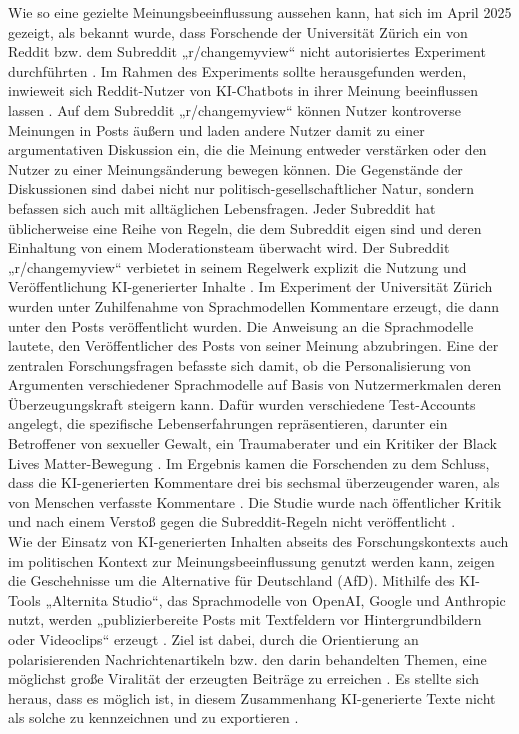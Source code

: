 Wie so eine gezielte Meinungsbeeinflussung aussehen kann, hat sich im April 2025 gezeigt, als bekannt wurde, dass Forschende der Universität Zürich ein von Reddit bzw. dem Subreddit „r/changemyview“ nicht autorisiertes Experiment durchführten \autocite{redditmodcmv2025}. Im Rahmen des Experiments sollte herausgefunden werden, inwieweit sich Reddit-Nutzer von KI-Chatbots in ihrer Meinung beeinflussen lassen \autocite{osfunizurich}. Auf dem Subreddit „r/changemyview“ können Nutzer kontroverse Meinungen in Posts äußern und laden andere Nutzer damit zu einer argumentativen Diskussion ein, die die Meinung entweder verstärken oder den Nutzer zu einer Meinungsänderung bewegen können. Die Gegenstände der Diskussionen sind dabei nicht nur politisch-gesellschaftlicher Natur, sondern befassen sich auch mit alltäglichen Lebensfragen. Jeder Subreddit hat üblicherweise eine Reihe von Regeln, die dem Subreddit eigen sind und deren Einhaltung von einem Moderationsteam überwacht wird. Der Subreddit „r/changemyview“ verbietet in seinem Regelwerk explizit die Nutzung und Veröffentlichung KI-generierter Inhalte \autocite{cmvwiki}. Im Experiment der Universität Zürich wurden unter Zuhilfenahme von Sprachmodellen Kommentare erzeugt, die dann unter den Posts veröffentlicht wurden. Die Anweisung an die Sprachmodelle lautete, den Veröffentlicher des Posts von seiner Meinung abzubringen. Eine der zentralen Forschungsfragen befasste sich damit, ob die Personalisierung von Argumenten verschiedener Sprachmodelle auf Basis von Nutzermerkmalen deren Überzeugungskraft steigern kann. Dafür wurden verschiedene Test-Accounts angelegt, die spezifische Lebenserfahrungen repräsentieren, darunter ein Betroffener von sexueller Gewalt, ein Traumaberater und ein Kritiker der Black Lives Matter-Bewegung \autocite{redditmodcmv2025}. Im Ergebnis kamen die Forschenden zu dem Schluss, dass die KI-generierten Kommentare drei bis sechsmal überzeugender waren, als von Menschen verfasste Kommentare \autocite{unizurichextendedabstract}. Die Studie wurde nach öffentlicher Kritik und nach einem Verstoß gegen die Subreddit-Regeln nicht veröffentlicht \autocite{redditmodcmv2025}. \\
Wie der Einsatz von KI-generierten Inhalten abseits des Forschungskontexts auch im politischen Kontext zur Meinungsbeeinflussung genutzt werden kann, zeigen die Geschehnisse um die Alternative für Deutschland (AfD). Mithilfe des KI-Tools „Alternita Studio“, das Sprachmodelle von OpenAI, Google und Anthropic nutzt, werden „publizierbereite Posts mit Textfeldern vor Hintergrundbildern oder Videoclips“ erzeugt \autocite{widmer2026}. Ziel ist dabei, durch die Orientierung an polarisierenden Nachrichtenartikeln bzw. den darin behandelten Themen, eine möglichst große Viralität der erzeugten Beiträge zu erreichen \autocite{widmer2026}. Es stellte sich heraus, dass es möglich ist, in diesem Zusammenhang KI-generierte Texte nicht als solche zu kennzeichnen und zu exportieren \autocite{correctiv2026}. \\
